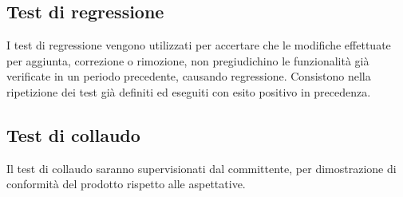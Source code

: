 \subsection{Test di regressione}
I test di regressione vengono utilizzati per accertare che le modifiche effettuate per aggiunta, correzione o rimozione, non pregiudichino le funzionalità già verificate in un periodo precedente, causando regressione. Consistono nella ripetizione dei test già definiti ed eseguiti con esito positivo in precedenza.

\subsection{Test di collaudo}
Il test di collaudo saranno supervisionati dal committente, per dimostrazione di conformità del prodotto rispetto alle aspettative.
